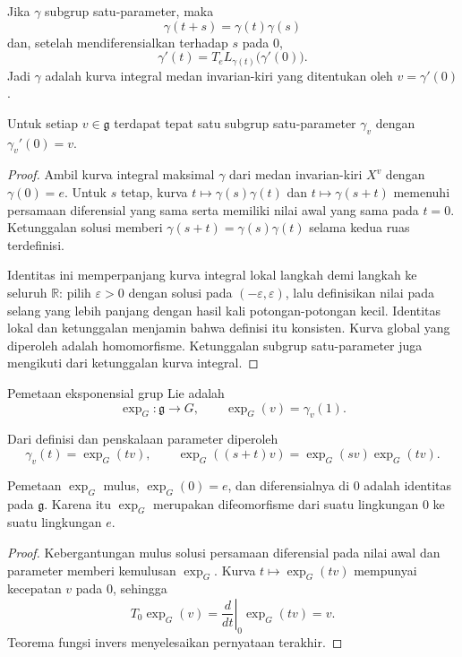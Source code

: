 Jika $\gamma$ subgrup satu-parameter, maka
\[
  \gamma(t+s)=\gamma(t)\gamma(s)
\]
dan, setelah mendiferensialkan terhadap $s$ pada $0$,
\[
  \gamma'(t)=T_eL_{\gamma(t)}\bigl(\gamma'(0)\bigr).
\]
Jadi $\gamma$ adalah kurva integral medan invarian-kiri yang ditentukan oleh
$v=\gamma'(0)$.

\begin{Theorem}\label{o011-bl-thm-one-parameter-existence}
Untuk setiap $v\in\mathfrak g$ terdapat tepat satu subgrup satu-parameter
$\gamma_v$ dengan $\gamma_v'(0)=v$.
\end{Theorem}

\begin{proof}
Ambil kurva integral maksimal $\gamma$ dari medan invarian-kiri $X^v$ dengan
$\gamma(0)=e$. Untuk $s$ tetap, kurva $t\mapsto\gamma(s)\gamma(t)$ dan
$t\mapsto\gamma(s+t)$ memenuhi persamaan diferensial yang sama serta memiliki
nilai awal yang sama pada $t=0$. Ketunggalan solusi memberi
$\gamma(s+t)=\gamma(s)\gamma(t)$ selama kedua ruas terdefinisi.

Identitas ini memperpanjang kurva integral lokal langkah demi langkah ke
seluruh $\mathbb R$: pilih $\varepsilon>0$ dengan solusi pada
$(-\varepsilon,\varepsilon)$, lalu definisikan nilai pada selang yang lebih
panjang dengan hasil kali potongan-potongan kecil. Identitas lokal dan
ketunggalan menjamin bahwa definisi itu konsisten. Kurva global yang diperoleh
adalah homomorfisme. Ketunggalan subgrup satu-parameter juga mengikuti dari
ketunggalan kurva integral.
\end{proof}

\begin{definition}\label{o011-bl-def-exponential}
Pemetaan eksponensial grup Lie adalah
\[
  \exp_G\colon\mathfrak g\longrightarrow G,
  \qquad \exp_G(v)=\gamma_v(1).
\]
\end{definition}

Dari definisi dan penskalaan parameter diperoleh
\[
  \gamma_v(t)=\exp_G(tv),
  \qquad
  \exp_G((s+t)v)=\exp_G(sv)\exp_G(tv).
\]

\begin{Proposition}\label{o011-bl-prop-exp-local}
Pemetaan $\exp_G$ mulus, $\exp_G(0)=e$, dan diferensialnya di $0$ adalah
identitas pada $\mathfrak g$. Karena itu $\exp_G$ merupakan difeomorfisme dari
suatu lingkungan $0$ ke suatu lingkungan $e$.
\end{Proposition}

\begin{proof}
Kebergantungan mulus solusi persamaan diferensial pada nilai awal dan parameter
memberi kemulusan $\exp_G$. Kurva $t\mapsto\exp_G(tv)$ mempunyai kecepatan $v$
pada $0$, sehingga
\[
  T_0\exp_G(v)=\left.\frac{d}{dt}\right|_{0}\exp_G(tv)=v.
\]
Teorema fungsi invers menyelesaikan pernyataan terakhir.
\end{proof}

